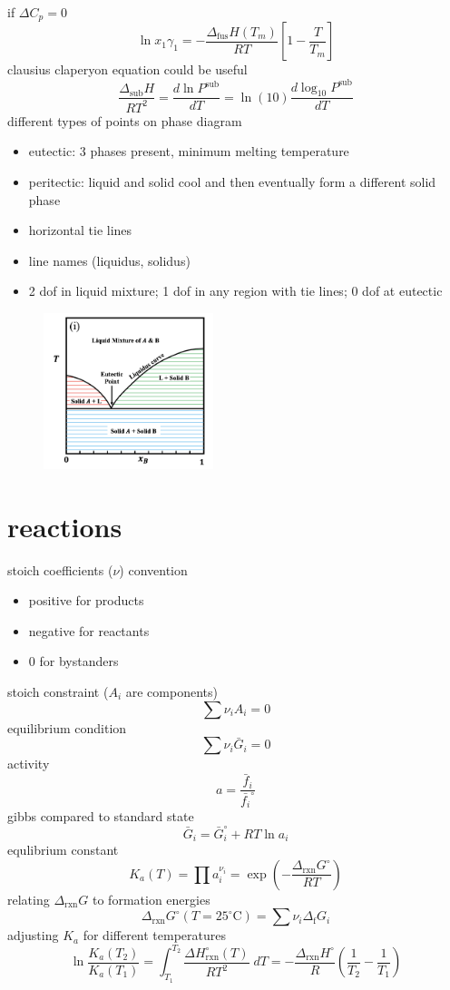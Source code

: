 \documentclass{article}
\begin{document}
if $\Delta C_{p}=0$ 
\[
\ln x_1 \gamma_1 = - 
\frac{\Delta_{\text{fus}} H(T_m)}{RT} \left[ 1 - \frac{T}{T_m} \right] 
\]
clausius claperyon equation could be useful
\[
\frac{\Delta_{\text{sub}} H}{RT^2} = \frac{d \ln P^{\text{sub}}}{dT} = \ln (10) \frac{d \log_{10} P^{\text{sub}}}{dT}
\]
different types of points on phase diagram
\begin{itemize}
    \item eutectic: 3 phases present, minimum melting temperature
    \item peritectic: liquid and solid cool and then eventually form a different solid phase
    \item horizontal tie lines
    \item line names (liquidus, solidus)
    \item 2 dof in liquid mixture; 1 dof in any region with tie lines; 0 dof at eutectic
\end{itemize}

\begin{figure}[ht] %
    \includegraphics[width=0.442\textwidth, frame]{solids.png}
\end{figure}

\section*{reactions}
stoich coefficients ($\nu$) convention
\begin{itemize}
    \item positive for products
    \item negative for reactants
    \item 0 for bystanders
\end{itemize}
stoich constraint ($A_{i}$ are components)
\[
\sum \nu_{i} A_{i} = 0
\]
equilibrium condition
\[
\sum \nu_{i} \bar{G}_{i} = 0
\]
activity
\[
a = \frac{\bar{f}_{i}}{\bar{f_{i}}^{\circ}}
\]
gibbs compared to standard state
\[
\bar{G}_{i} = \bar{G}_{i}^{\circ}+RT \ln a_{i}
\]
equlibrium constant
\[
K_{a}(T) = \prod a_{i}^{\nu_{i}} = \exp \left(-\frac{\Delta_{\mathrm{rxn}}G^{\circ}}{RT}\right)
\]
relating $\Delta_{\mathrm{rxn}}G$ to formation energies
\[
\Delta_{\mathrm{rxn}}G^{\circ}(T=25^{\circ}\mathrm{C}) = \sum \nu_{i}\Delta_{\mathrm{f}}G_{i}
\]
adjusting $K_{a}$ for different temperatures
\[
\ln\frac{K_{a}(T_{2})}{K_{a}(T_{1})}=\int_{T_{1}}^{T_{2}}\frac{\Delta H_{\mathrm{rxn}}^{\circ}(T)}{R T^{2}}\;d T=-\frac{\Delta_{\mathrm{rxn}}H^{\circ}}{R}\left(\frac{1}{T_{2}}-\frac{1}{T_{1}}\right)
\]
  
\end{document}
